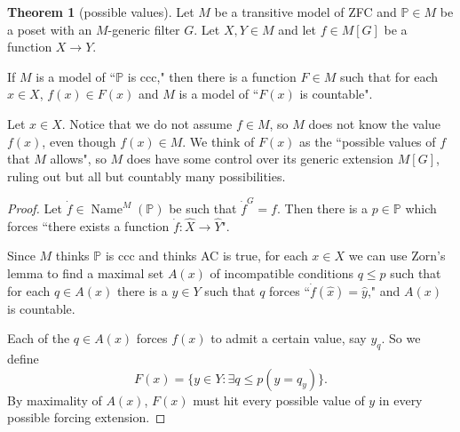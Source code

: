 \documentclass[12pt]{report}
\newcommand{\PP}{\mathbb{P}}
\DeclareMathOperator{\Name}{Name}
\theoremstyle{definition}
\newtheorem{theorem}{Theorem}[chapter]
\begin{document}
\begin{theorem}[possible values]
    Let $M$ be a transitive model of ZFC and $\PP \in M$ be a poset with an $M$-generic filter $G$. Let $X, Y \in M$ and let $f \in M[G]$ be a function $X \to Y$.

    If $M$ is a model of ``$\PP$ is ccc," then there is a function $F \in M$ such that for each $x \in X$, $f(x) \in F(x)$ and $M$ is a model of ``$F(x)$ is countable".
\end{theorem}
    Let $x \in X$. Notice that we do not assume $f \in M$, so $M$ does not know the value $f(x)$, even though $f(x) \in M$. We think of $F(x)$ as the ``possible values of $f$ that $M$ allows", so $M$ does have some control over its generic extension $M[G]$, ruling out but all but countably many possibilities.
\begin{proof}
    Let $\dot f \in \Name^M(\PP)$ be such that $\dot f^G = f$. Then there is a $p \in \PP$ which forces ``there exists a function $\dot f: \hat X \to \hat Y$".

    Since $M$ thinks $\PP$ is ccc and thinks AC is true, for each $x \in X$ we can use Zorn's lemma to find a maximal set $A(x)$ of incompatible conditions $q \leq p$ such that for each $q \in A(x)$ there is a $y \in Y$ such that $q$ forces ``$\dot f(\hat x) = \hat y$," and $A(x)$ is countable.

    Each of the $q \in A(x)$ forces $f(x)$ to admit a certain value, say $y_q$. So we define
    $$F(x) = \{y \in Y: \exists q \leq p(y = q_y)\}.$$
    By maximality of $A(x)$, $F(x)$ must hit every possible value of $y$ in every possible forcing extension.
\end{proof}
\end{document}
